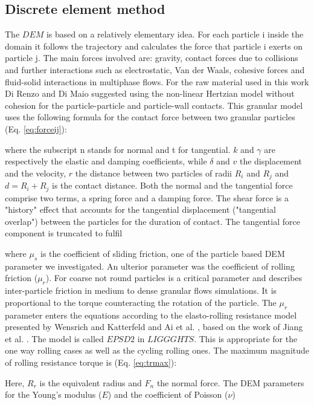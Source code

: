 \subsection{Discrete element method}
\label{subsec:dem}
The $DEM$ is based on a relatively elementary idea. 
For each particle i inside the domain it follows the trajectory and calculates the force that particle i exerts on particle j. 
The main forces involved are: gravity, contact forces due to collisions and further interactions such as electrostatic, 
Van der Waals, cohesive forces and fluid-solid interactions in multiphase flows. For the raw material used in this work 
Di Renzo and Di Maio \cite{RefWorks:145} suggested using the non-linear Hertzian model without cohesion for 
the particle-particle and particle-wall contacts. 
This granular model uses the following formula for the contact force between two granular particles (Eq. \ref{eq:forceij}):

where the subscript n stands for normal and t for tangential. 
$k$ and $\gamma$ are respectively the elastic and damping coefficients, 
while $\delta$ and $v$ the displacement and the velocity, $r$ the distance
between two particles of radii $R_i$ and $R_j$ and $d = R_i + R_j $ is the
contact distance.
Both the normal and the tangential
force comprise two terms, a spring force and a damping force. 
The shear force is a "history" effect that accounts for the tangential displacement 
("tangential overlap") between the particles for the duration of contact. 
The tangential force component is truncated to fulfil 

where $\mu_s$ is the coefficient of sliding friction, one of the particle based
DEM parameter we investigated. 
An ulterior parameter was the coefficient of rolling friction ($\mu_r$). 
For coarse not round particles is a critical parameter and describes inter-particle 
friction in medium to dense granular flows simulations. It is proportional to the 
torque counteracting the rotation of the particle. The $\mu_r$ parameter enters the 
equations according to the elasto-rolling resistance model presented by Wensrich and 
Katterfeld \cite{RefWorks:87} and Ai et al. \cite{RefWorks:131}, 
based on the work of Jiang et al. \cite{RefWorks:143}. 
The model is called $EPSD2$ in $LIGGGHTS$. This is appropriate for the one way
rolling cases as well as the cycling rolling ones.
The maximum magnitude of rolling resistance torque is (Eq. \ref{eq:trmax}):

Here, $R_r$ is the equivalent radius and $F_n$ the normal force.
The DEM parameters for the Young's modulus ($E$) and the coefficient of Poisson ($\nu$) 
